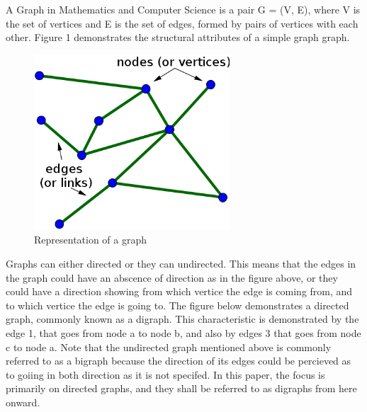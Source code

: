\label{Graph Basics}




\label{Graph Overview}
A Graph in Mathematics and Computer Science is a pair G = (V, E),  where V is the set of vertices and E is the set of edges, formed by pairs of vertices with each other. Figure 1 demonstrates the structural 
attributes of a simple graph graph.

\begin{figure}[H]
  \begin{center}
      \includegraphics[width=0.65\textwidth]{graph.PNG}
  \end{center}    
  \caption{Representation of a graph}
\end{figure}

Graphs can either directed or they can undirected. This means that the edges in the graph could have an abscence of direction as in the figure above, or they could have a direction showing from which
vertice the edge is coming from, and to which vertice the edge is going to. The figure below demonstrates a directed graph, commonly known as a digraph. This characteristic is demonstrated by the edge 1, 
that goes from node a to node b, and also by edges 3 that goes from node c to node a. Note that the undirected graph mentioned above is commonly referred to as a bigraph because the direction
of its edges  could be percieved as to goiing in both direction as it is not specifed.\newline\newline
In this paper, the focus is primarily on directed graphs, and they shall be referred to as digraphs from here onward.

